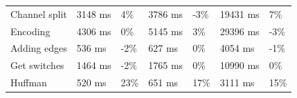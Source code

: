 \begin{table}[H]
\begin{tabular}{@{}lllllll@{}}
        Channel split           & 3148 ms                                                                                   & 4\%                                                                            & 3786 ms                                                                                    & -3\%                                                                          & 19431 ms                                                                                & 7\%                                                                           \\
        Encoding                & 4306 ms                                                                                   & 0\%                                                                            & 5145 ms                                                                                    & 3\%                                                                           & 29396 ms                                                                                & -3\%                                                                          \\
        Adding edges            & 536 ms                                                                                    & -2\%                                                                            & 627 ms                                                                                     & 0\%                                                                           & 4054 ms                                                                                 & -1\%                                                                          \\
        Get switches            & 1464 ms                                                                                   & -2\%                                                                            & 1765 ms                                                                                    & 0\%                                                                           & 10990 ms                                                                                & 0\%                                                                           \\
        Huffman                 & 520 ms                                                                                    & 23\%                                                                           & 651 ms                                                                                     & 17\%                                                                          & 3111 ms                                                                                 & 15\%                                                                          \\ \midrule

\end{tabular}
\end{table}
